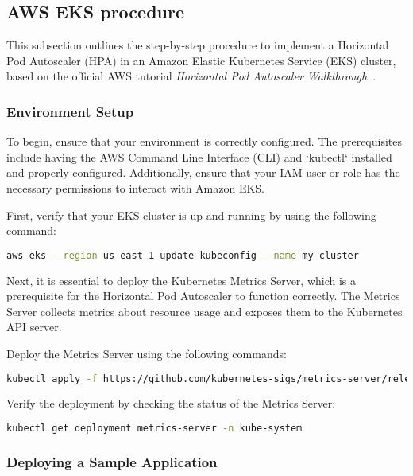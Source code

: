 \subsection{AWS EKS procedure}

This subsection outlines the step-by-step procedure to implement a Horizontal Pod Autoscaler (HPA) in an Amazon Elastic Kubernetes Service (EKS) cluster, based on the official AWS tutorial \textit{Horizontal Pod Autoscaler Walkthrough}~\cite{AwsHorizontalPodAutoescaler}.

\subsubsection{Environment Setup}

To begin, ensure that your environment is correctly configured. The prerequisites include having the AWS Command Line Interface (CLI) and `kubectl` installed and properly configured. Additionally, ensure that your IAM user or role has the necessary permissions to interact with Amazon EKS.

First, verify that your EKS cluster is up and running by using the following command:

\begin{lstlisting}[language=bash]
aws eks --region us-east-1 update-kubeconfig --name my-cluster
\end{lstlisting}

Next, it is essential to deploy the Kubernetes Metrics Server, which is a prerequisite for the Horizontal Pod Autoscaler to function correctly. The Metrics Server collects metrics about resource usage and exposes them to the Kubernetes API server.

Deploy the Metrics Server using the following commands:

\begin{lstlisting}[language=bash]
kubectl apply -f https://github.com/kubernetes-sigs/metrics-server/releases/latest/download/components.yaml
\end{lstlisting}

Verify the deployment by checking the status of the Metrics Server:

\begin{lstlisting}[language=bash]
kubectl get deployment metrics-server -n kube-system
\end{lstlisting}

\subsubsection{Deploying a Sample Application}

